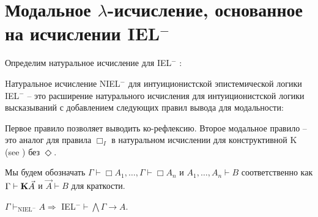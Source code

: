 \section{Модальное $\lambda$-исчисление, основанное на исчислении IEL$^{-}$}

Определим натуральное исчисление для IEL$^{-}$ :

\begin{defin} Hатуральное исчисление NIEL$^{-}$ для интуиционистской эпистемической логики IEL$^{-}$ -- это
расширение натурального исчисления для интуиционистской логики высказываний с добавлением следующих правил вывода для модальности:

\begin{minipage}{0.5\textwidth}
  \begin{flushleft}
  \begin{prooftree}
\end{prooftree}
  \end{flushleft}
\end{minipage}
\begin{minipage}{0.5\textwidth}
  \begin{flushright}
  \begin{prooftree}
  \end{prooftree}
  \end{flushright}
\end{minipage}
\end{defin}

Первое правило позволяет выводить ко-рефлексию. Второе модальное правило -- это аналог для правила $\Box_I$
в натуральном исчислении для конструктивной K (see \cite{ModalLa}) без $\Diamond$.

Мы будем обозначать $\Gamma \vdash \Box A_1, \dots, \Gamma \vdash \Box A_n$ и $A_1,\dots,A_n \vdash B$ соответственно как $\Gamma \vdash {\bf K} \vec{A}$ и $\vec{A} \vdash B$ для краткости.

\vspace{\baselineskip}

\begin{lemma}
  $\Gamma \vdash_{\text{NIEL}^{-}} A \Rightarrow$ IEL$^{-} \vdash \bigwedge \Gamma \rightarrow A$.
\end{lemma}

